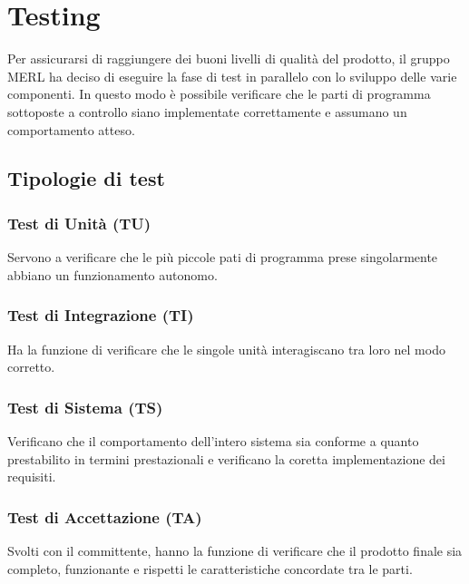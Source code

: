 \chapter{Testing}
Per assicurarsi di raggiungere dei buoni livelli di qualità del prodotto, il gruppo MERL ha deciso di eseguire la fase di test in parallelo con lo sviluppo delle varie componenti. In questo modo è possibile verificare che le parti di programma sottoposte a controllo siano implementate correttamente e assumano un comportamento atteso.
\section{Tipologie di test}
    \subsection{Test di Unità (TU)}  Servono a verificare che le più piccole pati di programma prese singolarmente abbiano un funzionamento autonomo.
    \subsection{Test di Integrazione (TI)} Ha la funzione di verificare che le singole unità interagiscano tra loro nel modo corretto.
    \subsection{Test di Sistema (TS)} Verificano che il comportamento dell'intero sistema sia conforme a quanto prestabilito in termini prestazionali e verificano la coretta implementazione dei requisiti.
    \subsection{Test di Accettazione (TA)} Svolti con il committente, hanno la funzione di verificare che il prodotto 
        finale sia completo, funzionante e rispetti le caratteristiche concordate tra le parti.


